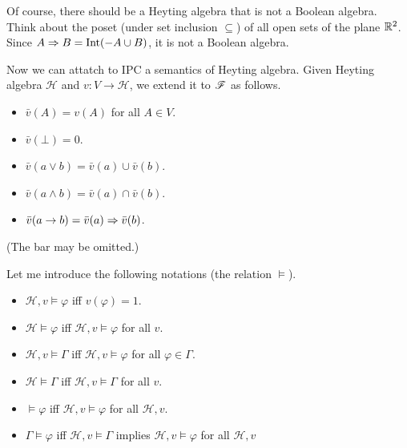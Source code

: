 Of course, there should be a Heyting algebra that is not a Boolean
algebra. Think about the poset (under set inclusion $\subseteq$) of
all open sets of the plane $\mathbb{R}^2$. Since 
$A\Rightarrow B=\text{Int}(-A\cup B)$, it is not a Boolean algebra. 

\newcommand{\Heyting}{\mathcal{H}}
Now we can attatch to IPC a semantics of Heyting algebra.
Given Heyting algebra $\Heyting$ and $v: V\to \Heyting$, we
extend it to $\mathscr{F}$ as follows.
\begin{itemize}
    \item $\bar{v}(A)=v(A)$ for all $A\in V$.
    \item $\bar{v}(\bot)=0$.
    \item $\bar{v}(a\vee b)=\bar{v}(a)\cup \bar{v}(b)$.
    \item $\bar{v}(a\wedge b)=\bar{v}(a)\cap \bar{v}(b)$.
    \item $\bar{v}(a\to b)=\bar{v}(a)\Rightarrow \bar{v}(b)$.
\end{itemize}
(The bar may be omitted.)

Let me introduce the following notations (the relation $\models$).
\begin{itemize}
    \item $\Heyting,v\models \varphi$ iff $v(\varphi) = 1$.
    \item $\Heyting\models\varphi$ iff $\Heyting,v\models\varphi$ for all $v$.
    \item $\Heyting,v\models \Gamma$ iff $\Heyting,v\models \varphi$ for all $\varphi\in\Gamma$.
    \item $\Heyting\models\Gamma$ iff $\Heyting,v\models\Gamma$ for all $v$.
    \item $\models\varphi$ iff $\Heyting,v\models\varphi$ for all $\Heyting, v$.
    \item $\Gamma\models\varphi$ iff $\Heyting,v\models\Gamma$ implies $\Heyting,v\models\varphi$ for all $\Heyting, v$
\end{itemize}

